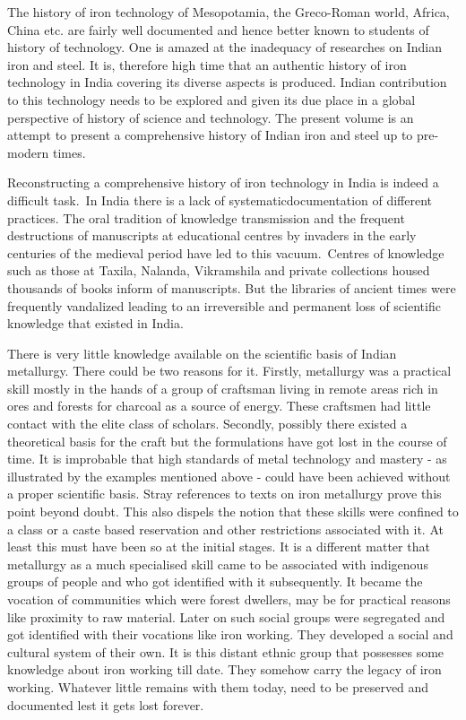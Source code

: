 The history of iron technology of Mesopotamia, the Greco-Roman world, Africa, China etc. are fairly well documented and hence better known to students of history of technology. One is amazed at the inadequacy of researches on Indian iron and steel. It is, therefore high time that an authentic history of iron technology in India covering its diverse aspects is produced. Indian contribution to this technology needs to be explored and given its due place in a global perspective of history of science and technology. The present volume is an attempt to present a comprehensive history of Indian iron and steel up to pre-modern times.

Reconstructing a comprehensive history of iron technology in India is indeed a difficult task.~In India there is a lack of systematic\break documentation of different practices. The oral tradition of knowledge transmission and the frequent destructions of manuscripts at educational centres by invaders in the early centuries of the medieval period have led to this vacuum.~Centres of knowledge such as those at Taxila, Nalanda, Vikramshila and private collections housed thousands of books inform of manuscripts. But the libraries of ancient times were frequently vandalized leading to an irreversible and permanent loss of scientific knowledge that existed in India.

There is very little knowledge available on the scientific basis of Indian metallurgy. There could be two reasons for it. Firstly, metallurgy was a practical skill mostly in the hands of a group of craftsman living in remote areas rich in ores and forests for charcoal as a source of energy. These craftsmen had little contact with the elite class of scholars. Secondly, possibly there existed a theoretical basis for the craft but the formulations have got lost in the course of time. It is improbable that high standards of metal technology and mastery - as illustrated by the examples mentioned above - could have been achieved without a proper scientific basis. Stray references to texts on iron metallurgy prove this point beyond doubt. This also dispels the notion that these skills were confined to a class or a caste based reservation and other restrictions associated with it. At least this must have been so at the initial stages. It is a different matter that metallurgy as a much specialised skill came to be associated with indigenous  groups of people and who got identified with it subsequently. It became the vocation of communities which were forest dwellers, may be for practical reasons like proximity to raw material. Later on such social groups were segregated and got identified with their vocations like iron working. They developed a social and cultural system of their own. It is this distant ethnic group that possesses some knowledge about iron working till date. They somehow carry the legacy of iron working. Whatever little remains with them today, need to be preserved and documented lest it gets lost forever.

